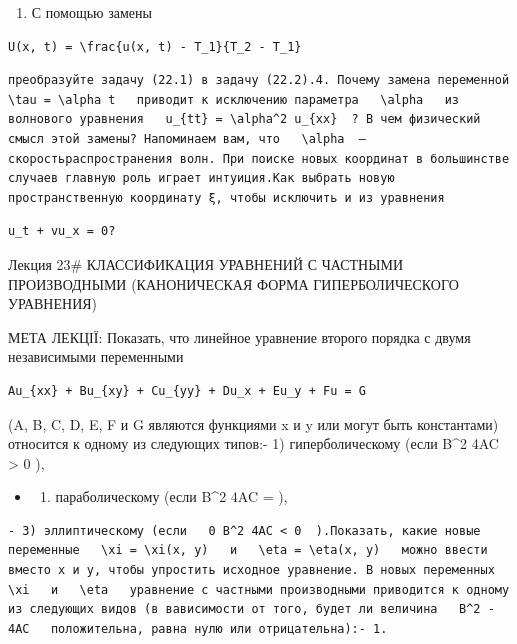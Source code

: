 \documentclass[
  ukrainian,
]{article}
\providecommand{\tightlist}{%
  \setlength{\itemsep}{0pt}\setlength{\parskip}{0pt}}
\begin{document}
\begin{enumerate}
\def\labelenumi{\arabic{enumi}.}
\setcounter{enumi}{2}
\tightlist
\item
  С помощью замены
\end{enumerate}

\begin{verbatim}
U(x, t) = \frac{u(x, t) - T_1}{T_2 - T_1}
\end{verbatim}

\begin{verbatim}
преобразуйте задачу (22.1) в задачу (22.2).4. Почему замена переменной   \tau = \alpha t   приводит к исключению параметра   \alpha   из волнового уравнения   u_{tt} = \alpha^2 u_{xx}  ? В чем физический смысл этой замены? Напоминаем вам, что   \alpha  —скоростьраспространения волн. При поиске новых координат в большинстве случаев главную роль играет интуиция.Как выбрать новую пространственную координату ξ, чтобы исключить и из уравнения
\end{verbatim}

\begin{verbatim}
u_t + vu_x = 0?
\end{verbatim}

Лекция 23\# КЛАССИФИКАЦИЯ УРАВНЕНИЙ С ЧАСТНЫМИ ПРОИЗВОДНЫМИ
(КАНОНИЧЕСКАЯ ФОРМА ГИПЕРБОЛИЧЕСКОГО УРАВНЕНИЯ)

МЕТА ЛЕКЦІЇ: Показать, что линейное уравнение второго порядка с двумя
независимыми переменными

\begin{verbatim}
Au_{xx} + Bu_{xy} + Cu_{yy} + Du_x + Eu_y + Fu = G
\end{verbatim}

(A, B, C, D, E, F и G являются функциями x и y или могут быть
константами) относится к одному из следующих типов:- 1) гиперболическому
(если B\^{}2 4AC \textgreater{} 0 ),

\begin{itemize}
\tightlist
\item
  \begin{enumerate}
  \def\labelenumi{\arabic{enumi})}
  \setcounter{enumi}{1}
  \tightlist
  \item
    параболическому (если B\^{}2 4AC = ),
  \end{enumerate}
\end{itemize}

\begin{verbatim}
- 3) эллиптическому (если   0 B^2 4AC < 0  ).Показать, какие новые переменные   \xi = \xi(x, y)   и   \eta = \eta(x, y)   можно ввести вместо x и y, чтобы упростить исходное уравнение. В новых переменных   \xi   и   \eta   уравнение с частными производными приводится к одному из следующих видов (в вависимости от того, будет ли величина   B^2 - 4AC   положительна, равна нулю или отрицательна):- 1.  
\end{verbatim}
\end{document}
